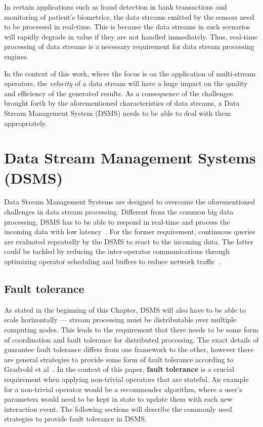 In certain applications such as fraud detection in bank transactions and monitoring of 
patient's biometrics, the data streams emitted by the sensors need to be processed in 
real-time. This is because the data streams in such scenarios will rapidly degrade in 
value if they are not handled immediately. Thus, real-time processing of data streams 
is a necessary requirement for data stream processing engines. 

In the context of this work, where the focus is on the application of multi-stream operators, 
the \emph{velocity} of a data stream will have a huge impact on the quality and efficiency of 
the generated results. As a consequence of the challenges brought forth by the 
aforementioned characteristics of data streams, a Data Stream Management System (DSMS) needs 
to be able to deal with them appropriately.  

\section{Data Stream Management Systems (DSMS)} 
Data Stream Management Systems are designed to overcome the aforementioned challenges 
in data stream processing. Different from the common big data processing, DSMS has to be 
able to respond in real-time and process the incoming data with low latency~\cite{data_stream_management}. 
For the former requirement, continuous queries are evaluated repeatedly by the DSMS to react 
to the incoming data. The latter could be tackled by reducing the inter-operator communications 
through optimizing operator scheduling and buffers to reduce network traffic~\cite{low_latency_data_stream}. 



\subsection{Fault tolerance}
As stated in the beginning of this Chapter, DSMS will also have to be able to scale 
horizontally --- stream processing must be distributable over multiple computing nodes. 
This leads to the requirement that there needs to be some form of coordination and fault tolerance 
for distributed processing. The exact details of guarantee fault tolerance differs from 
one framework to the other, however there are general strategies to provide some 
form of fault tolerance according to Gradvohl et al~\cite{fault_tolerance_dsms}.
In the context of this paper, \textbf{fault tolerance} is a crucial requirement when applying
non-trivial operators that are stateful. 
An example for a non-trivial operator would be a recommender algorithm, where 
a user's parameters would need to be kept in state to update them with each new 
interaction event. 
The following sections will describe the commonly used strategies to provide fault tolerance 
in DSMS. 

